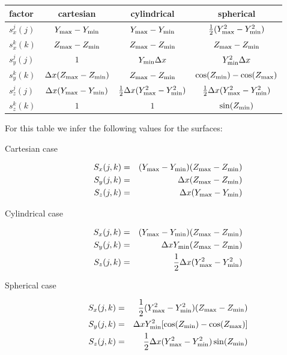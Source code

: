 \documentclass{article}
\begin{document}
\begin{table}[h]
  \centering
  \begin{tabular}{|l|c|c|c|}
    \hline
    factor & cartesian & cylindrical & spherical \\
    \hline
    \phantom{$\displaystyle\int$}$s_x^j(j)$ & $Y_{\rm max}-Y_{\rm min}$ & $Y_{\rm max}-Y_{\rm min}$ & $\frac 12(Y_{\rm max}^2-Y_{\rm min}^2)$\\
   \hline
   \phantom{$\displaystyle\int$}$s_x^k(k)$ & $Z_{\rm max}-Z_{\rm min}$ & $Z_{\rm max}-Z_{\rm min}$ & $Z_{\rm max}-Z_{\rm min}$\\
   \hline
   \phantom{$\displaystyle\int$}$s_y^j(j)$ & $1$ & $Y_{\rm min}\Delta x$ & $Y_{\rm min}^2\Delta x$\\
  \hline
  \phantom{$\displaystyle\int$}$s_y^k(k)$ & $\Delta x(Z_{\rm max}-Z_{\rm min})$ & $Z_{\rm max}-Z_{\rm min}$ & $\cos(Z_{\rm min})-\cos(Z_{\rm max})$\\
   \hline
   \phantom{$\displaystyle\int$}$s_z^j(j)$ & $\Delta x(Y_{\rm max}-Y_{\rm min})$ & $\frac 12\Delta x(Y_{\rm max}^2-Y_{\rm min}^2)$ & $\frac 12\Delta x(Y_{\rm max}^2-Y_{\rm min}^2)$ \\
  \hline
  \phantom{$\displaystyle\int$}$s_z^k(k)$ & $1$ & $1$ & $\sin(Z_{\rm min})$\\
 \hline
  \end{tabular}
\end{table}
For this table we infer the following values for the surfaces:
\begin{description}
\item[Cartesian case] 
  \begin{eqnarray}
    \label{eq:2}
    S_x(j,k) &=& (Y_{\rm max}-Y_{\rm min})(Z_{\rm max}-Z_{\rm min})\\
    S_y(j,k) &=& \Delta x (Z_{\rm max}-Z_{\rm min})\\
    S_z(j,k) &=& \Delta x (Y_{\rm max}-Y_{\rm min})
  \end{eqnarray}
\item[Cylindrical case] 
  \begin{eqnarray}
    \label{eq:3}
    S_x(j,k) &=& (Y_{\rm max}-Y_{\rm min})(Z_{\rm max}-Z_{\rm min})\\
    S_y(j,k) &=& \Delta x Y_{\rm min}(Z_{\rm max}-Z_{\rm min})\\
    S_z(j,k) &=& \frac 12\Delta x(Y_{\rm max}^2-Y_{\rm min}^2)
  \end{eqnarray}
\item[Spherical case] 
  \begin{eqnarray}
    \label{eq:4}
    S_x(j,k) &=& \frac 12(Y_{\rm max}^2-Y_{\rm min}^2)(Z_{\rm max}-Z_{\rm min})\\
    S_y(j,k) &=& \Delta xY_{\rm min}^2[\cos(Z_{\rm min})-\cos(Z_{\rm max})]\\
    S_z(j,k) &=& \frac 12\Delta x(Y_{\rm max}^2-Y_{\rm min}^2)\sin(Z_{\rm min})
  \end{eqnarray}
\end{description}
\end{document}
